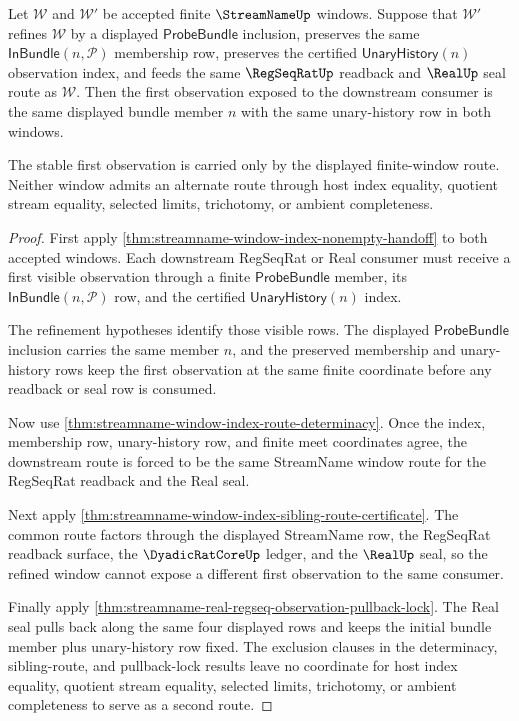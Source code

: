 \begin{theorem}
\label{thm:streamname-window-refinement-first-observation-stability}
Let $\mathcal W$ and $\mathcal W'$ be accepted finite $\StreamNameUp$
windows. Suppose that $\mathcal W'$ refines $\mathcal W$ by a displayed
$\mathsf{ProbeBundle}$ inclusion, preserves the same
$\mathsf{InBundle}(n,\mathcal P)$ membership row, preserves the certified
$\mathsf{UnaryHistory}(n)$ observation index, and feeds the same
$\RegSeqRatUp$ readback and $\RealUp$ seal route as $\mathcal W$. Then the
first observation exposed to the downstream consumer is the same displayed
bundle member $n$ with the same unary-history row in both windows.

The stable first observation is carried only by the displayed finite-window
route. Neither window admits an alternate route through host index equality,
quotient stream equality, selected limits, trichotomy, or ambient
completeness.
\end{theorem}
\begin{proof}
First apply
\autoref{thm:streamname-window-index-nonempty-handoff} to both accepted
windows. Each downstream RegSeqRat or Real consumer must receive a first
visible observation through a finite $\mathsf{ProbeBundle}$ member, its
$\mathsf{InBundle}(n,\mathcal P)$ row, and the certified
$\mathsf{UnaryHistory}(n)$ index.

The refinement hypotheses identify those visible rows. The displayed
$\mathsf{ProbeBundle}$ inclusion carries the same member $n$, and the
preserved membership and unary-history rows keep the first observation at the
same finite coordinate before any readback or seal row is consumed.

Now use \autoref{thm:streamname-window-index-route-determinacy}. Once the
index, membership row, unary-history row, and finite meet coordinates agree,
the downstream route is forced to be the same StreamName window route for the
RegSeqRat readback and the Real seal.

Next apply
\autoref{thm:streamname-window-index-sibling-route-certificate}. The common
route factors through the displayed StreamName row, the RegSeqRat readback
surface, the $\DyadicRatCoreUp$ ledger, and the $\RealUp$ seal, so the
refined window cannot expose a different first observation to the same
consumer.

Finally apply
\autoref{thm:streamname-real-regseq-observation-pullback-lock}. The Real seal
pulls back along the same four displayed rows and keeps the initial bundle
member plus unary-history row fixed. The exclusion clauses in the determinacy,
sibling-route, and pullback-lock results leave no coordinate for host index
equality, quotient stream equality, selected limits, trichotomy, or ambient
completeness to serve as a second route.
\end{proof}
